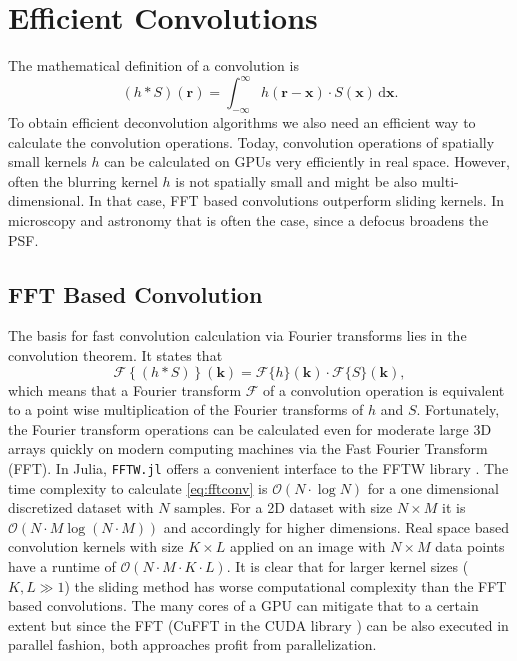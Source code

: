 \documentclass{juliacon}
\begin{document}
\section{Efficient Convolutions}
The mathematical definition of a convolution is
\begin{equation}
    (h * S)(\mathbf r) = \int_{-\infty}^{\infty} h(\mathbf r - \mathbf x) \cdot S(\mathbf x) \, \mathrm d \mathbf x.
    \label{eq:conv}
\end{equation}
To obtain efficient deconvolution algorithms we also need an efficient way to calculate the convolution operations.
Today, convolution operations of spatially small kernels $h$ can be calculated on GPUs very efficiently in real space.
However, often the blurring kernel $h$ is not spatially small and might be also multi-dimensional. In that case, FFT based convolutions
outperform sliding kernels. In microscopy and astronomy that is often the case, since a defocus broadens the PSF.

\subsection{FFT Based Convolution}
    The basis for fast convolution calculation via Fourier transforms lies in the convolution theorem. It states that
    \begin{equation}
        \mathcal F\left\{(h * S)\right\}(\mathbf k) = \mathcal F\{h\} (\mathbf k) \cdot \mathcal F\{S\} (\mathbf k),
        \label{eq:fftconv}
    \end{equation} 
        which means that a Fourier transform $\mathcal F$ of a convolution operation is equivalent to a point wise multiplication of the Fourier transforms 
        of $h$ and $S$.
        Fortunately, the Fourier transform operations can be calculated even for moderate large 3D arrays quickly on modern computing machines via
        the Fast Fourier Transform (FFT).
        In Julia, \verb|FFTW.jl| offers a convenient interface to the FFTW library \cite{FFTW05}.
        The time complexity to calculate \autoref{eq:fftconv} is $\mathcal{O}(N \cdot \log N)$ for a one dimensional discretized dataset with $N$ samples.
        For a 2D dataset with size $N \times M$ it is $\mathcal{O}(N \cdot M \log(N \cdot M))$ and accordingly for higher dimensions.
        Real space based convolution kernels with size $K \times L$ applied on an image with
        $N \times M$ data points have a runtime of $\mathcal O(N \cdot M \cdot K \cdot L)$.
        It is clear that for larger kernel sizes ($K,L \gg 1$) the sliding method 
        has worse computational complexity than the FFT based convolutions. The many cores of a GPU can mitigate that to a certain extent
        but since the FFT (CuFFT in the CUDA library \cite{CUDA}) can be also executed in parallel fashion, 
        both approaches profit from parallelization.
        
\end{document}
